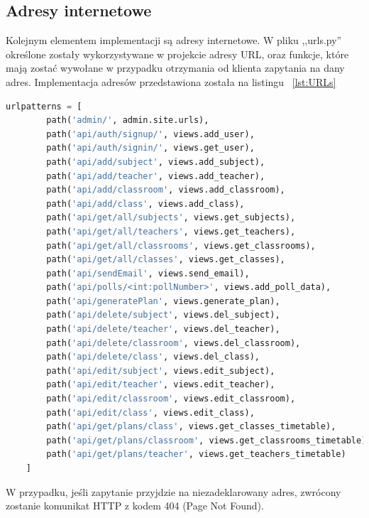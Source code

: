 \subsection{Adresy internetowe}
Kolejnym elementem implementacji są adresy internetowe. W pliku ,,urls.py'' określone zostały wykorzystywane w projekcie adresy URL, oraz funkcje, które mają zostać wywołane w przypadku otrzymania od klienta zapytania na dany adres. Implementacja adresów przedstawiona została na listingu ~\ref{lst:URLs}
\begin{lstlisting}[language=Python, caption=Implementacja adresów URL, label={lst:URLs}]
	urlpatterns = [
		path('admin/', admin.site.urls),
		path('api/auth/signup/', views.add_user),
		path('api/auth/signin/', views.get_user),
		path('api/add/subject', views.add_subject),
		path('api/add/teacher', views.add_teacher),
		path('api/add/classroom', views.add_classroom),
		path('api/add/class', views.add_class),
		path('api/get/all/subjects', views.get_subjects),
		path('api/get/all/teachers', views.get_teachers),
		path('api/get/all/classrooms', views.get_classrooms),
		path('api/get/all/classes', views.get_classes),
		path('api/sendEmail', views.send_email),
		path('api/polls/<int:pollNumber>', views.add_poll_data),
		path('api/generatePlan', views.generate_plan),
		path('api/delete/subject', views.del_subject),
		path('api/delete/teacher', views.del_teacher),
		path('api/delete/classroom', views.del_classroom),
		path('api/delete/class', views.del_class),
		path('api/edit/subject', views.edit_subject),
		path('api/edit/teacher', views.edit_teacher),
		path('api/edit/classroom', views.edit_classroom),
		path('api/edit/class', views.edit_class),
		path('api/get/plans/class', views.get_classes_timetable),
		path('api/get/plans/classroom', views.get_classrooms_timetable),
		path('api/get/plans/teacher', views.get_teachers_timetable)
	]
\end{lstlisting}
W przypadku, jeśli zapytanie przyjdzie na niezadeklarowany adres, zwrócony zostanie komunikat HTTP z kodem 404 (Page Not Found).

